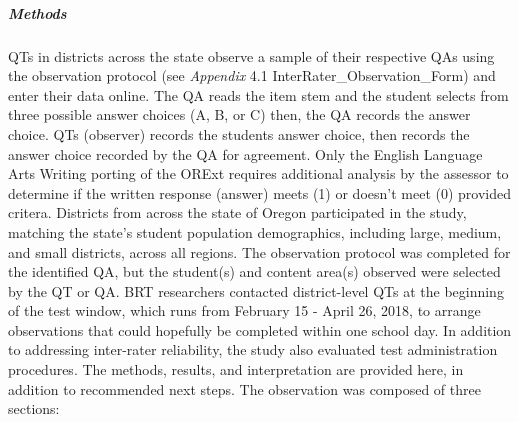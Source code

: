 \documentclass[]{article}
\let\oldsubparagraph\subparagraph
\renewcommand{\subparagraph}[1]{\oldsubparagraph{#1}\mbox{}}
\begin{document}
\subparagraph{Methods}\label{methods}

QTs in districts across the state observe a sample of their respective
QAs using the observation protocol (see \emph{Appendix} 4.1
InterRater\_Observation\_Form) and enter their data online. The QA reads
the item stem and the student selects from three possible answer choices
(A, B, or C) then, the QA records the answer choice. QTs (observer)
records the students answer choice, then records the answer choice
recorded by the QA for agreement. Only the English Language Arts Writing
porting of the ORExt requires additional analysis by the assessor to
determine if the written response (answer) meets (1) or doesn't meet (0)
provided critera. Districts from across the state of Oregon participated
in the study, matching the state's student population demographics,
including large, medium, and small districts, across all regions. The
observation protocol was completed for the identified QA, but the
student(s) and content area(s) observed were selected by the QT or QA.
BRT researchers contacted district-level QTs at the beginning of the
test window, which runs from February 15 - April 26, 2018, to arrange
observations that could hopefully be completed within one school day. In
addition to addressing inter-rater reliability, the study also evaluated
test administration procedures. The methods, results, and interpretation
are provided here, in addition to recommended next steps. The
observation was composed of three sections:
\end{document}
